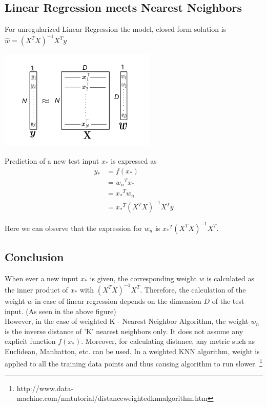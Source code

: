 \documentclass[a4paper,11pt]{article}
\newcommand\tab[1][1cm]{\hspace*{#1}}
\begin{document}
\begin{mlsolution}

\section*{Linear Regression meets Nearest Neighbors}
\tab For unregularized Linear Regression the model, closed form solution is $\hat{w} = (X^TX)^{-1}X^Ty$
\begin{center}
\includegraphics[scale=.5]{linreg}

\end{center}
\noindent
\tab Prediction of a new test input $x_*$ is expressed as \noindent 
\begin{align*}
  y_* &= f(x_*)\\
  &= {w_n}^Tx_*\\
  &= {x_*}^Tw_n\\
  &= {x_*}^T(X^TX)^{-1}X^Ty
\end{align*}

\noindent
\tab Here we can observe that the expression for $w_n$ is ${x_*}^T(X^TX)^{-1}X^T$.
\subsection*{Conclusion}
\tab When ever a new input $x_*$ is given, the corresponding weight $w$ is calculated as the inner product of $x_*$ with $(X^TX)^{-1}X^T$. Therefore, the calculation of the weight $w$ in case of linear regression depends on the dimension $D$ of the test input. (As seen in the above figure)\\

\noindent
\tab However, in the case of weighted K - Nearest Neighbor Algorithm, the weight $w_n$ is the inverse distance of 'K' nearest neighbors only. It does not assume any explicit function $f(x_*)$. Moreover, for calculating distance, any metric such as Euclidean, Manhatton, etc. can be used. In a weighted KNN algorithm, weight is applied to all the training data points and thus causing algorithm to run slower. \footnote{http://www.data-machine.com/nmtutorial/distanceweightedknnalgorithm.htm }

\end{mlsolution}
\end{document}
